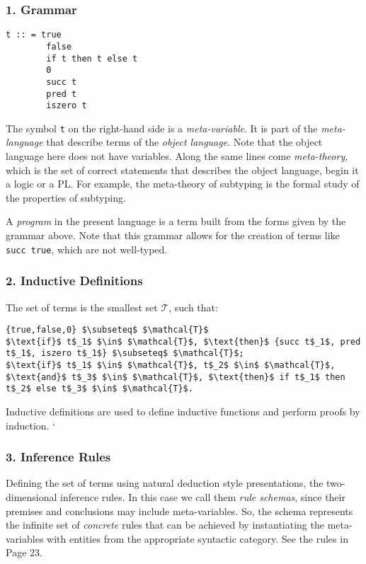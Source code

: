 \documentclass[fleqn]{article}
\begin{document}
\subsubsection*{1. Grammar} 
\begin{verbatim}
t :: = true  
        false 
        if t then t else t 
        0 
        succ t 
        pred t 
        iszero t 
\end{verbatim}
The symbol \verb|t| on the right-hand side is a \emph{meta-variable}. It is part of the \emph{meta-language} that describe terms of the \emph{object language}. Note that the object language here does not have variables. Along the same lines come \emph{meta-theory}, which is the set of correct statements that describes the object language, begin it a logic or a PL. For example, the meta-theory of subtyping is the formal study of the properties of subtyping. 

A \emph{program} in the present language is a term built from the forms given by the grammar above. Note that this grammar allows for the creation of terms like \verb|succ true|, which are not well-typed.

\subsubsection*{2. Inductive Definitions}
The set of terms is the smallest set $\mathcal{T}$, such that: 
\begin{lstlisting}[mathescape=true]
{true,false,0} $\subseteq$ $\mathcal{T}$
$\text{if}$ t$_1$ $\in$ $\mathcal{T}$, $\text{then}$ {succ t$_1$, pred t$_1$, iszero t$_1$} $\subseteq$ $\mathcal{T}$; 
$\text{if}$ t$_1$ $\in$ $\mathcal{T}$, t$_2$ $\in$ $\mathcal{T}$, $\text{and}$ t$_3$ $\in$ $\mathcal{T}$, $\text{then}$ if t$_1$ then t$_2$ else t$_3$ $\in$ $\mathcal{T}$.
\end{lstlisting}
Inductive definitions are used to define inductive functions and perform proofs by induction. 	`

\subsubsection*{3. Inference Rules}
Defining the set of terms using natural deduction style presentations, the two-dimensional inference rules. In this case we call them \emph{rule schemas}, since their premises and conclusions may include meta-variables. So, the schema represents the infinite set of \emph{concrete} rules that can be achieved by instantiating the meta-variables with entities from the appropriate syntactic category. See the rules in Page 23. 
\end{document}
